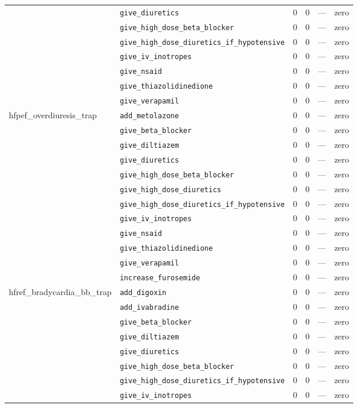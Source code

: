 \begin{table}[ht]
\begin{tabular}{llrrrl}
 & \texttt{give\_diuretics} & 0 & 0 & — & zero \\
 & \texttt{give\_high\_dose\_beta\_blocker} & 0 & 0 & — & zero \\
 & \texttt{give\_high\_dose\_diuretics\_if\_hypotensive} & 0 & 0 & — & zero \\
 & \texttt{give\_iv\_inotropes} & 0 & 0 & — & zero \\
 & \texttt{give\_nsaid} & 0 & 0 & — & zero \\
 & \texttt{give\_thiazolidinedione} & 0 & 0 & — & zero \\
 & \texttt{give\_verapamil} & 0 & 0 & — & zero \\
\midrule
hfpef\_overdiuresis\_trap & \texttt{add\_metolazone} & 0 & 0 & — & zero \\
 & \texttt{give\_beta\_blocker} & 0 & 0 & — & zero \\
 & \texttt{give\_diltiazem} & 0 & 0 & — & zero \\
 & \texttt{give\_diuretics} & 0 & 0 & — & zero \\
 & \texttt{give\_high\_dose\_beta\_blocker} & 0 & 0 & — & zero \\
 & \texttt{give\_high\_dose\_diuretics} & 0 & 0 & — & zero \\
 & \texttt{give\_high\_dose\_diuretics\_if\_hypotensive} & 0 & 0 & — & zero \\
 & \texttt{give\_iv\_inotropes} & 0 & 0 & — & zero \\
 & \texttt{give\_nsaid} & 0 & 0 & — & zero \\
 & \texttt{give\_thiazolidinedione} & 0 & 0 & — & zero \\
 & \texttt{give\_verapamil} & 0 & 0 & — & zero \\
 & \texttt{increase\_furosemide} & 0 & 0 & — & zero \\
\midrule
hfref\_bradycardia\_bb\_trap & \texttt{add\_digoxin} & 0 & 0 & — & zero \\
 & \texttt{add\_ivabradine} & 0 & 0 & — & zero \\
 & \texttt{give\_beta\_blocker} & 0 & 0 & — & zero \\
 & \texttt{give\_diltiazem} & 0 & 0 & — & zero \\
 & \texttt{give\_diuretics} & 0 & 0 & — & zero \\
 & \texttt{give\_high\_dose\_beta\_blocker} & 0 & 0 & — & zero \\
 & \texttt{give\_high\_dose\_diuretics\_if\_hypotensive} & 0 & 0 & — & zero \\
 & \texttt{give\_iv\_inotropes} & 0 & 0 & — & zero \\

\end{tabular}
\end{table}
